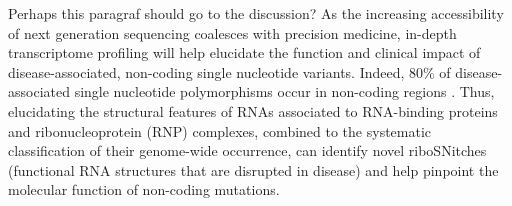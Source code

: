 \documentclass{bmcart}
\begin{document}
%

{\color{red} Perhaps this paragraf should go to the discussion?}
As the increasing accessibility of next generation sequencing coalesces with precision medicine, 
in-depth transcriptome profiling will help elucidate the function and clinical impact of disease-associated,
non-coding single nucleotide variants. 
Indeed, 80\% of disease-associated single nucleotide polymorphisms occur in non-coding regions 
\cite{hindorff2009potential,ritchie2014functional}. Thus, elucidating the structural features of RNAs associated to RNA-binding proteins and ribonucleoprotein (RNP) complexes, combined to the systematic classification of their genome-wide occurrence, 
can identify novel riboSNitches (functional RNA structures that are disrupted in disease) 
and help pinpoint the molecular function of non-coding mutations. \\

%
\end{document}
